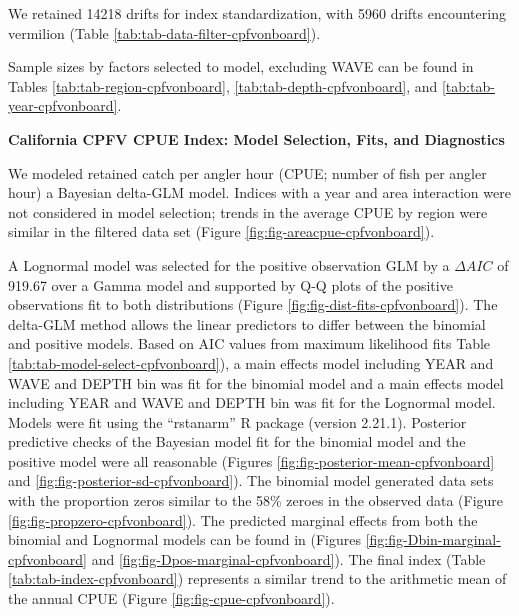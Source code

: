 \documentclass[
  english,
  a4paper,
]{article}
\begin{document}
We retained 14218 drifts for index standardization, with
5960 drifts encountering vermilion
(Table \ref{tab:tab-data-filter-cpfvonboard}).

Sample sizes by factors selected to model, excluding WAVE can be found in Tables
\ref{tab:tab-region-cpfvonboard}, \ref{tab:tab-depth-cpfvonboard}, and \ref{tab:tab-year-cpfvonboard}.

\textbf{California CPFV CPUE Index: Model Selection, Fits, and Diagnostics}

We modeled retained catch per angler hour (CPUE; number of fish per angler hour)
a Bayesian delta-GLM model. Indices with a year and area interaction were not
considered in model selection; trends in the average CPUE by region were similar
in the filtered data set (Figure \ref{fig:fig-areacpue-cpfvonboard}).

A Lognormal model was
selected for the positive observation GLM by
a \(\Delta AIC\) of 919.67 over a Gamma model and supported by Q-Q plots of the positive observations fit to both distributions (Figure \ref{fig:fig-dist-fits-cpfvonboard}). The delta-GLM
method allows the linear predictors to differ between the binomial and positive models.
Based on AIC values from maximum likelihood fits Table \ref{tab:tab-model-select-cpfvonboard}),
a main effects model including
YEAR and WAVE and DEPTH bin
was fit for the binomial model and a main
effects model including
YEAR and WAVE and DEPTH bin
was fit for the Lognormal model.
Models were fit using the ``rstanarm'' R package (version 2.21.1). Posterior predictive
checks of the Bayesian model fit for the binomial model and the positive model
were all reasonable (Figures \ref{fig:fig-posterior-mean-cpfvonboard} and
\ref{fig:fig-posterior-sd-cpfvonboard}). The binomial model generated data sets with the
proportion zeros similar to the 58\% zeroes in the observed data
(Figure \ref{fig:fig-propzero-cpfvonboard}). The predicted marginal effects from
both the binomial and Lognormal models can be found in (Figures \ref{fig:fig-Dbin-marginal-cpfvonboard} and \ref{fig:fig-Dpos-marginal-cpfvonboard}). The
final index (Table \ref{tab:tab-index-cpfvonboard})
represents a similar trend to the arithmetic mean of the annual CPUE (Figure \ref{fig:fig-cpue-cpfvonboard}).

\newpage
\end{document}
